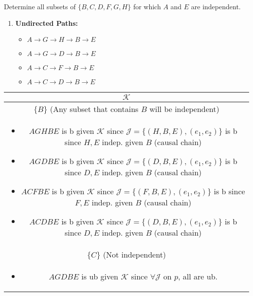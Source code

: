 \begin{example}
    Determine all subsets of $\{B,C,D,F,G,H\}$ for which $A$ and $E$ are independent. 
    \begin{enumerate}
        \item \textbf{Undirected Paths:}
        \begin{itemize}
            \item $A \to G \to H \to B \to E$
            \item $A \to G \to D \to B \to E$
            \item $A \to C \to F \to B \to E$
            \item $A \to C \to D \to B \to E$
        \end{itemize}
    \end{enumerate}
    \begin{center}
        \begin{tabular}{c}
            \toprule
            $\mathcal{K}$ \\
            \midrule
            $\{B\}$ (Any subset that contains $B$ will be independent) \\
            \multicolumn{1}{p{\linewidth}}{
                \begin{itemize}
                    \item $AGHBE$ is b given $\mathcal{K}$ since $\mathcal{J} = \{(H,B,E),(e_1,e_2)\}$ is b since $H,E$ indep. given $B$ (causal chain)
                    \item $AGDBE$ is b given $\mathcal{K}$ since $\mathcal{J} = \{(D,B,E),(e_1,e_2)\}$ is b since $D,E$ indep. given $B$ (causal chain)
                    \item $ACFBE$ is b given $\mathcal{K}$ since $\mathcal{J} = \{(F,B,E),(e_1,e_2)\}$ is b since $F,E$ indep. given $B$ (causal chain) 
                    \item $ACDBE$ is b given $\mathcal{K}$ since $\mathcal{J} = \{(D,B,E),(e_1,e_2)\}$ is b since $D,E$ indep. given $B$ (causal chain) 
                \end{itemize}} \\
            \midrule
            $\{C\}$ (Not independent) \\
            \multicolumn{1}{p{\linewidth}}{
                \begin{itemize}
                    \item $AGDBE$ is ub given $\mathcal{K}$ since $\forall \mathcal{J}$ on $p$, all are ub.
                \end{itemize}} \\

\end{tabular}
\end{center}
\end{example}
